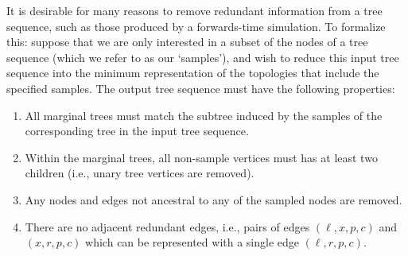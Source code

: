 \documentclass{article}
\begin{document}
It is desirable for many reasons to remove redundant information from a tree sequence,
such as those produced by a forwards-time simulation.
To formalize this:
suppose that we are only interested in a subset of the nodes of a tree sequence
(which we refer to as our `samples'),
and wish to reduce this input tree sequence
into the minimum representation of the topologies that include the specified samples.
The output tree sequence must have the following properties:
\begin{enumerate}
\item All marginal trees must match the subtree induced by the samples of the corresponding tree in the input tree sequence.
\item Within the marginal trees, all non-sample vertices must has at least
two children (i.e., unary tree vertices are removed).
\item Any nodes and edges not ancestral to any of the sampled nodes are removed.
\item There are no adjacent redundant edges, i.e., pairs of edges
    $(\ell, x, p, c)$ and $(x, r, p, c)$ which can be represented with a single edge
    $(\ell, r, p, c)$.
\end{enumerate}
\end{document}
